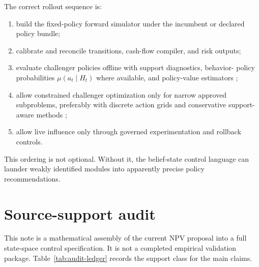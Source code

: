\documentclass[11pt]{article}
\newcommand{\1}{\mathbf{1}}
\theoremstyle{definition}
\begin{document}
The correct rollout sequence is:
\begin{enumerate}[label=\arabic*.]
  \item build the fixed-policy forward simulator under the incumbent or declared
        policy bundle;
  \item calibrate and reconcile transitions, cash-flow compiler, and risk
        outputs;
  \item evaluate challenger policies offline with support diagnostics, behavior-
        policy probabilities $\mu(a_t\mid H_t)$ where available, and policy-value
        estimators \citep{dudik2011dr,jiangli2016dr,thomasbrunskill2016ope};
  \item allow constrained challenger optimization only for narrow approved
        subproblems, preferably with discrete action grids and conservative
        support-aware methods \citep{ernst2005fqi,laroche2019spibb,
        fujimoto2019bcq,kumar2020cql};
  \item allow live influence only through governed experimentation and rollback
        controls.
\end{enumerate}

This ordering is not optional. Without it, the belief-state control language can
launder weakly identified modules into apparently precise policy recommendations.

\section{Source-support audit}
\label{sec:audit}

This note is a mathematical assembly of the current NPV proposal into a full
state-space control specification. It is not a completed empirical validation
package. Table~\ref{tab:audit-ledger} records the support class for the main
claims.
\end{document}
